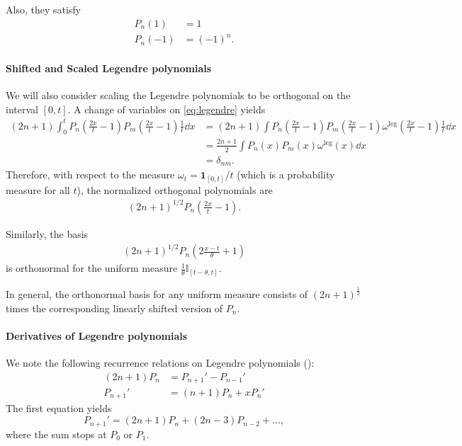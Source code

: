 \documentclass[../hippo.tex]{subfiles}
\begin{document}
Also, they satisfy
\begin{align*}%
  P_n(1) &= 1 \\
  P_n(-1) &= (-1)^{n}
  .
\end{align*}

\paragraph{Shifted and Scaled Legendre polynomials}
We will also consider scaling the Legendre polynomials to be orthogonal on the
interval $[0, t]$.
A change of variables on \eqref{eq:legendre} yields
\begin{align*}
  (2n+1) \int_0^t P_n\left( \frac{2x}{t}-1 \right) P_m \left( \frac{2x}{t} - 1 \right) \frac{1}{t} \dd x
  &=
  (2n+1) \int P_n\left( \frac{2x}{t}-1 \right) P_m \left( \frac{2x}{t} - 1 \right) \omega^{\mathrm{leg}}\left( \frac{2x}{t}-1 \right) \frac{1}{t} \dd x
  \\
  &=
  \frac{2n+1}{2} \int P_n(x) P_m(x) \omega^{\mathrm{leg}}(x) \dd x
  \\
  &= \delta_{nm}
  .
\end{align*}
Therefore, with respect to the measure $\omega_t = \mathbf{1}_{[0,t]}/t$ (which is a probability measure for all $t$),
the normalized orthogonal polynomials are
\begin{align*}
  (2n+1)^{1/2} P_n\left( \frac{2x}{t}-1 \right)
  .
\end{align*}

Similarly, the basis
\begin{align*}
  (2n+1)^{1/2} P_n\left( 2\frac{x-t}{\theta} + 1 \right)
\end{align*}
is orthonormal for the uniform measure $\frac{1}{\theta}\mathbb{I}_{[t-\theta, t]}$.

In general, the orthonormal basis for any uniform measure
consists of $(2n+1)^{\frac{1}{2}}$ times the corresponding linearly shifted version of $P_n$.

\paragraph{Derivatives of Legendre polynomials}

We note the following recurrence relations on Legendre polynomials (\citep[Chapter~12]{arfken2005mathematical}):
\begin{align*}
  (2n+1)P_n &= P_{n+1}' - P_{n-1}' \\
  P_{n+1}' &= (n+1)P_n + xP_n'
\end{align*}
The first equation yields
\begin{equation}%
  P_{n+1}' = (2n+1)P_n + (2n-3)P_{n-2} + \dots,
\end{equation}
where the sum stops at $P_0$ or $P_1$.
\end{document}
